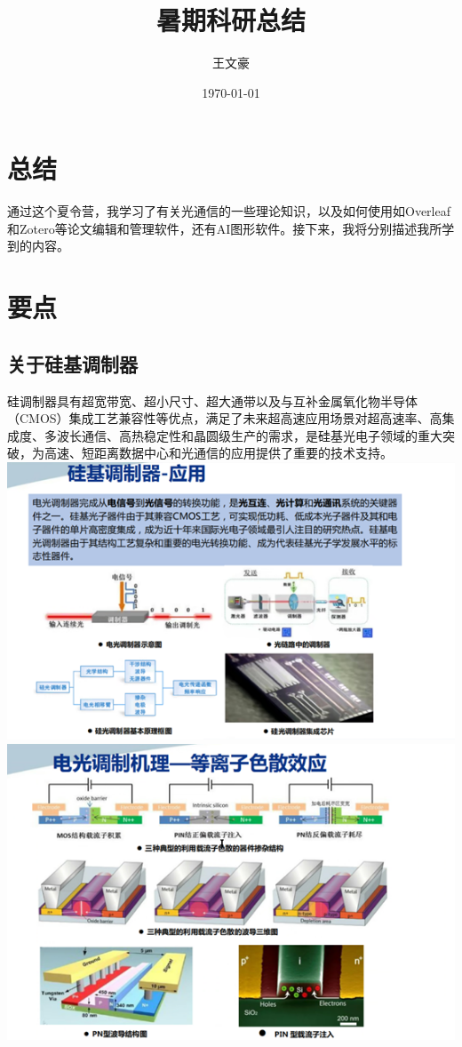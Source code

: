 \documentclass{article}
\title{暑期科研总结}
\author{王文豪}
\date{\today}
\begin{document}
\maketitle
\section{总结}
通过这个夏令营，我学习了有关光通信的一些理论知识，以及如何使用如Overleaf和Zotero等论文编辑和管理软件，还有AI图形软件。接下来，我将分别描述我所学到的内容。
\section{要点}
\subsection{关于硅基调制器}
硅调制器具有超宽带宽、超小尺寸、超大通带以及与互补金属氧化物半导体（CMOS）集成工艺兼容性等优点，满足了未来超高速应用场景对超高速率、高集成度、多波长通信、高热稳定性和晶圆级生产的需求，是硅基光电子领域的重大突破，为高速、短距离数据中心和光通信的应用提供了重要的技术支持。
\\
\noindent\includegraphics[width=\linewidth]{p1.png}
\noindent\includegraphics[width=\linewidth]{p2.png}
\end{document}
